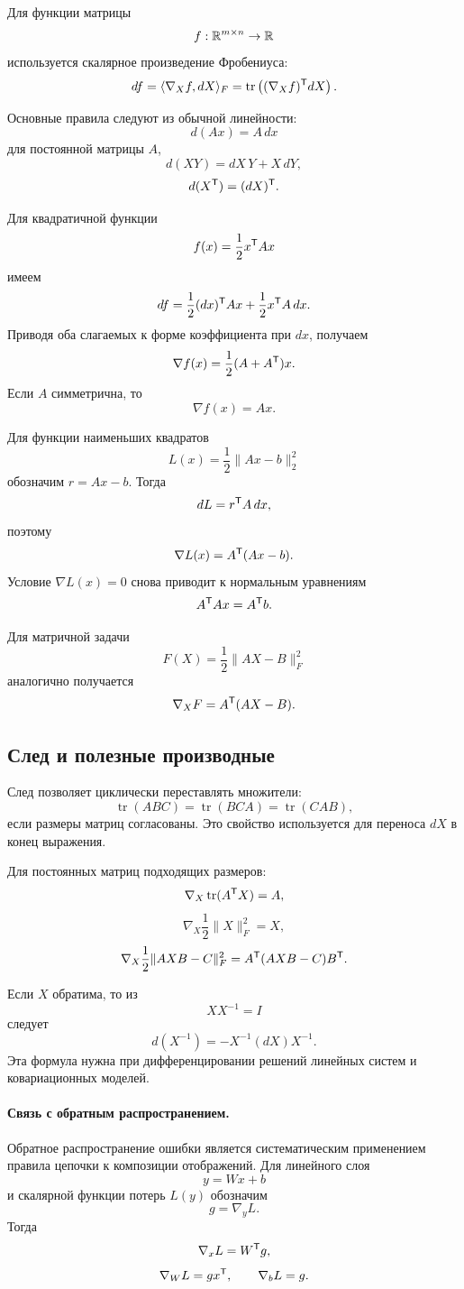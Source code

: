 Для функции матрицы
\[
f:\mathbb{R}^{m\times n}\to\mathbb{R}
\]
используется скалярное произведение Фробениуса:
\[
df
=
\langle\nabla_X f,dX\rangle_F
=
\operatorname{tr}\left(
(\nabla_X f)^{\mathsf{T}}dX
\right).
\]

Основные правила следуют из обычной линейности:
\[
d(Ax)=A\,dx
\]
для постоянной матрицы \(A\),
\[
d(XY)=dX\,Y+X\,dY,
\]
\[
d(X^{\mathsf{T}})=(dX)^{\mathsf{T}}.
\]

Для квадратичной функции
\[
f(x)=\frac12x^{\mathsf{T}}Ax
\]
имеем
\[
df
=
\frac12(dx)^{\mathsf{T}}Ax
+
\frac12x^{\mathsf{T}}A\,dx.
\]
Приводя оба слагаемых к форме коэффициента при \(dx\), получаем
\[
\nabla f(x)
=
\frac12(A+A^{\mathsf{T}})x.
\]
Если \(A\) симметрична, то
\[
\nabla f(x)=Ax.
\]

Для функции наименьших квадратов
\[
L(x)=\frac12\|Ax-b\|_2^2
\]
обозначим \(r=Ax-b\). Тогда
\[
dL
=
r^{\mathsf{T}}A\,dx,
\]
поэтому
\[
\nabla L(x)
=
A^{\mathsf{T}}(Ax-b).
\]
Условие \(\nabla L(x)=0\) снова приводит к нормальным уравнениям
\[
A^{\mathsf{T}}Ax=A^{\mathsf{T}}b.
\]

Для матричной задачи
\[
F(X)
=
\frac12\|AX-B\|_F^2
\]
аналогично получается
\[
\nabla_XF
=
A^{\mathsf{T}}(AX-B).
\]

\subsection{След и полезные производные}

След позволяет циклически переставлять множители:
\[
\operatorname{tr}(ABC)
=
\operatorname{tr}(BCA)
=
\operatorname{tr}(CAB),
\]
если размеры матриц согласованы. Это свойство используется для переноса \(dX\) в конец выражения.

Для постоянных матриц подходящих размеров:
\[
\nabla_X\operatorname{tr}(A^{\mathsf{T}}X)=A,
\]
\[
\nabla_X\frac12\|X\|_F^2=X,
\]
\[
\nabla_X\frac12\|AXB-C\|_F^2
=
A^{\mathsf{T}}(AXB-C)B^{\mathsf{T}}.
\]

Если \(X\) обратима, то из
\[
XX^{-1}=I
\]
следует
\[
d(X^{-1})
=
-X^{-1}(dX)X^{-1}.
\]
Эта формула нужна при дифференцировании решений линейных систем и ковариационных моделей.

\paragraph{Связь с обратным распространением.}

Обратное распространение ошибки является систематическим применением правила цепочки к композиции отображений. Для линейного слоя
\[
y=Wx+b
\]
и скалярной функции потерь \(L(y)\) обозначим
\[
g=\nabla_yL.
\]
Тогда
\[
\nabla_xL=W^{\mathsf{T}}g,
\]
\[
\nabla_WL=gx^{\mathsf{T}},
\qquad
\nabla_bL=g.
\]

